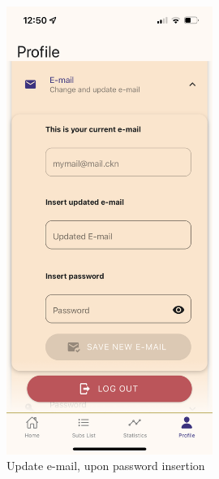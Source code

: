 \documentclass[11pt]{article}
\begin{document}
\begin{figure}[h!]
\begin{minipage}[c]{0.45\textwidth}
        \includegraphics[width=0.6\textwidth, clip]{../../assets/smartphone/profileNewMail.PNG}
        \caption{Update e-mail, upon password insertion}
        \label{fig:profileNewMail}
    \end{minipage}
\end{figure}
\end{document}
